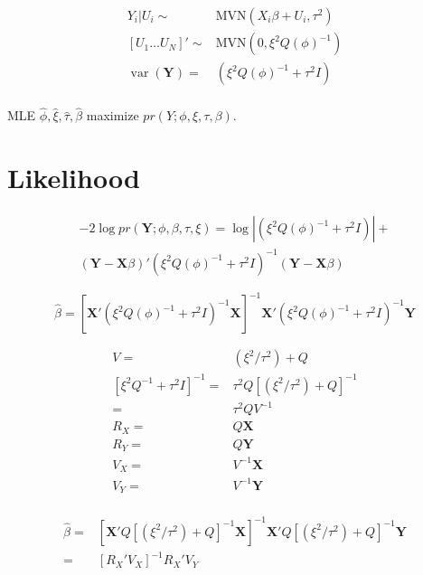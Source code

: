 \documentclass[12pt]{article}
\DeclareMathOperator{\var}{var}
\begin{document}
\begin{align*}
Y_i| U_i \sim & \text{MVN}(X_i\beta + U_i, \tau^2 )\\
[U_1 \ldots U_N]' \sim  & \text{MVN}(0, \xi^2 Q(\phi)^{-1})\\
\var(\mathbf{Y})  = &  ( \xi^2 Q(\phi)^{-1} + \tau^2 I  )  \\
\end{align*}

MLE  $\hat\phi, \hat\xi, \hat\tau,\hat\beta$  maximize $pr(Y ;
\phi,\xi,\tau,\beta)$.

\section*{Likelihood}



\begin{multline*}
-2 \log pr(\mathbf{Y};\phi,\beta,\tau,\xi) =
\log| (\xi^2  Q(\phi)^{-1} + \tau^2 I  ) | + \\
( \mathbf{Y} -\mathbf{X}\beta)  '
  (\xi^2  Q(\phi)^{-1} + \tau^2 I  )^{-1}
(\mathbf{Y} - \mathbf{X}\beta)
\end{multline*}

\[
\hat\beta = [ \mathbf{X}'
(  \xi^2  Q(\phi)^{-1} + \tau^2 I )^{-1}   \mathbf{X}]^{-1}
\mathbf{X}'(\xi^2  Q(\phi)^{-1} +
\tau^2 I  )^{-1} \mathbf{Y}
\]



\begin{align*}
V = & (\xi^2/\tau^2) + Q\\
[\xi^2 Q^{-1} + \tau^2 I]^{-1}= & \tau^2 Q [(\xi^2/\tau^2) + Q]^{-1} \\
= & \tau^2 Q V^{-1}\\
R_X =& Q \mathbf{X}\\
R_Y =& Q \mathbf{Y}\\
V_X = &V^{-1} \mathbf{X}\\
V_Y =& V^{-1} \mathbf{Y}\\
\end{align*}


\begin{align*}
\hat\beta =  &[ \mathbf{X}'
 Q [(\xi^2/\tau^2) + Q]^{-1}  \mathbf{X}]^{-1}
\mathbf{X}' Q [(\xi^2/\tau^2) + Q]^{-1}  \mathbf{Y}\\
= & [ R_X' V_X ]^{-1}  R_X' V_Y\\
\end{align*}
\end{document}
